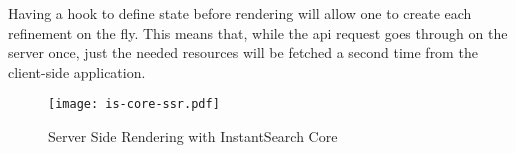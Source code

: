 Having a hook to define state before rendering will allow one to create each refinement on the fly. This means that, while the \acrshort{api} request goes through on the server once, just the needed resources will be fetched a second time from the client-side application. 

\begin{figure}[H]
  \centering
  \texttt{[image: is-core-ssr.pdf]}
  \caption{Server Side Rendering with InstantSearch Core}
  \label{figure:is-core-ssr}
\end{figure}


